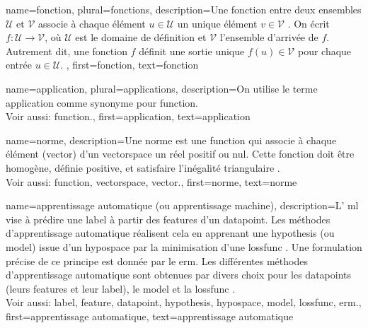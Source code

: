 
\newcommand{\gaussiancenter}{3}

{name={fonction}, plural={fonctions}, 
	description={Une fonction entre deux ensembles $\mathcal{U}$ et $\mathcal{V}$ associe à chaque élément $u \in \mathcal{U}$ un unique élément $v \in \mathcal{V}$ \cite{RudinBookPrinciplesMatheAnalysis}. 
		On écrit $f: \mathcal{U} \rightarrow \mathcal{V}$, où $\mathcal{U}$ est le domaine de définition
		et $\mathcal{V}$ l'ensemble d'arrivée de $f$. Autrement dit, une fonction $f$ définit une sortie unique 
		$f(u) \in \mathcal{V}$ pour chaque entrée $u \in \mathcal{U}$.
	},
	first={fonction},
	text={fonction} 
}

{name={application}, plural={applications}, 
	description={On utilise le terme application comme synonyme pour \gls{function}.
		\\
		Voir aussi: \gls{function}.},
	first={application},
	text={application}
}

{name={norme},
	description={Une norme est une \gls{function} qui associe à chaque élément (\gls{vector}) d’un \gls{vectorspace} un réel positif ou nul. Cette fonction doit être homogène, définie positive, et satisfaire l’inégalité triangulaire \cite{HornMatAnalysis}.
		\\
		Voir aussi: \gls{function}, \gls{vectorspace}, \gls{vector}.},
	first={norme}, text={norme}
}

{name={apprentissage automatique (ou apprentissage machine)},
	description={L’ \gls{ml} vise à prédire une \gls{label} à partir des \glspl{feature} d’un \gls{datapoint}. Les méthodes d’apprentissage automatique réalisent cela en apprenant une \gls{hypothesis} (ou \gls{model}) issue d’un \gls{hypospace} par la minimisation d’une \gls{lossfunc} \cite{MLBasics,HastieWainwrightBook}. Une formulation précise de ce principe est donnée par le \gls{erm}. Les différentes méthodes d’apprentissage automatique sont obtenues par divers choix pour les \glspl{datapoint} (leurs \glspl{feature} et leur \gls{label}), le \gls{model} et la \gls{lossfunc} \cite[Ch. 3]{MLBasics}.
		\\ 
		Voir aussi: \gls{label}, \gls{feature}, \gls{datapoint}, \gls{hypothesis}, \gls{hypospace}, \gls{model}, \gls{lossfunc}, \gls{erm}.},
	first={apprentissage automatique}, text={apprentissage automatique}
}

